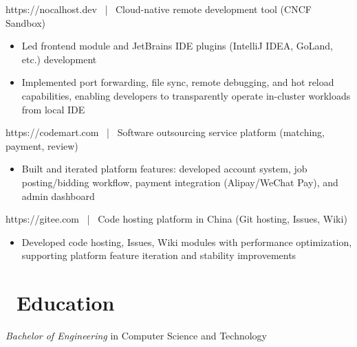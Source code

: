 \documentclass{resume}
\begin{document}
https://nocalhost.dev \ | \ Cloud-native remote development tool (CNCF Sandbox)
\begin{onehalfspacing}
\begin{itemize}
  \item Led frontend module and JetBrains IDE plugins (IntelliJ IDEA, GoLand, etc.) development
  \item Implemented port forwarding, file sync, remote debugging, and hot reload capabilities, enabling developers to transparently operate in-cluster workloads from local IDE
\end{itemize}
\end{onehalfspacing}

https://codemart.com \ | \ Software outsourcing service platform (matching, payment, review)
\begin{onehalfspacing}
\begin{itemize}
  \item Built and iterated platform features: developed account system, job posting/bidding workflow, payment integration (Alipay/WeChat Pay), and admin dashboard
\end{itemize}
\end{onehalfspacing}

https://gitee.com \ | \ Code hosting platform in China (Git hosting, Issues, Wiki)
\begin{onehalfspacing}
\begin{itemize}
  \item Developed code hosting, Issues, Wiki modules with performance optimization, supporting platform feature iteration and stability improvements
\end{itemize}
\end{onehalfspacing}

\section{\faGraduationCap\ Education}
\textit{Bachelor of Engineering} in Computer Science and Technology
\end{document}
